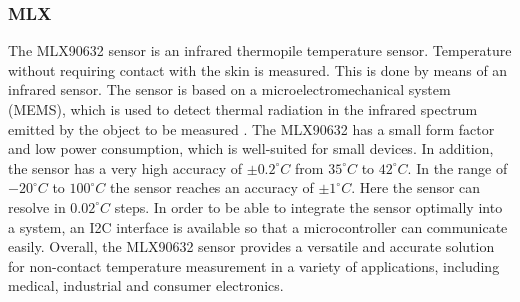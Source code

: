 \subsubsection{MLX}
\label{Background:TemperatureSensors:OpticalTS:MLX}
The MLX90632 sensor is an infrared thermopile temperature sensor.
Temperature without requiring contact with the skin is measured. 
This is done by means of an infrared sensor. 
The sensor is based on a microelectromechanical system (MEMS), which is used to detect thermal radiation in the infrared spectrum emitted by the object to be measured \cite{melexisMLX90632FIRSensor2021}.
The MLX90632 has a small form factor and low power consumption, which is well-suited for small devices.
In addition, the sensor has a very high accuracy of $\pm 0.2 ^\circ C$ from $35 ^\circ C$  to $42 ^\circ C$.
In the range of $-20 ^\circ C$  to $100 ^\circ C$ the sensor reaches an accuracy of $\pm 1 ^\circ C$.
Here the sensor can resolve in $0.02 ^\circ C$ steps.
In order to be able to integrate the sensor optimally into a system, an I2C interface is available so that a microcontroller can communicate easily.
Overall, the MLX90632 sensor provides a versatile and accurate solution for non-contact temperature measurement in a variety of applications, including medical, industrial and consumer electronics.



